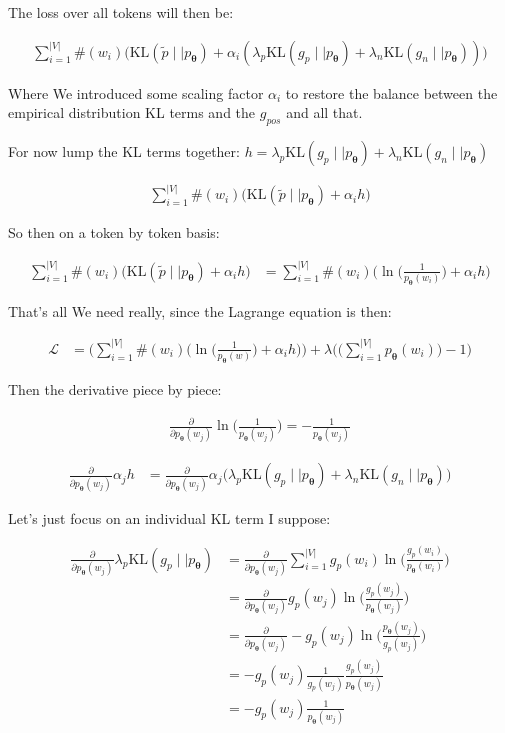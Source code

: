 \documentclass{article}
\newcommand{\KL}{\mathrm{KL}}
\newcommand{\vtheta}{\boldsymbol{\theta}}
\newcommand{\model}{p_{\vtheta}}
\begin{document}
	    The loss over all tokens will then be:
		
		\begin{align}
			\sum^{|V|}_{i=1} \#(w_i)\big(\KL(\tilde{p}\mid\mid\model) + \alpha_i(\lambda_p\KL(g_p\mid\mid\model) + \lambda_n\KL(g_n\mid\mid\model))\big)
		\end{align}
		
		Where We introduced some scaling factor $\alpha_i$ to restore the balance between the empirical distribution KL terms and the $g_{pos}$ and all that.
		
		
		For now lump the KL terms together: $h = \lambda_p\KL(g_p\mid\mid\model) + \lambda_n\KL(g_n\mid\mid\model)$
		
		\begin{align}
			\sum^{|V|}_{i=1} \#(w_i)\big(\KL(\tilde{p}\mid\mid\model) + \alpha_i h\big)
		\end{align}
		
		So then on a token by token basis:
		
		\begin{align}
			\sum^{|V|}_{i=1} \#(w_i) \big(\KL(\tilde{p}\mid\mid\model) + \alpha_i h \big)&= \sum^{|V|}_{i=1} \#(w_i) \bigg(\ln\bigg(\frac{1}{\model(w_i)}\bigg) + \alpha_i h \bigg)
		\end{align}
		
		That's all We need really, since the Lagrange equation is then:
		
		\begin{align}
			\mathcal{L} &= \bigg(\sum^{|V|}_{i=1} \#(w_i) \bigg(\ln\bigg(\frac{1}{\model(w)}\bigg) + \alpha_i h \bigg)\bigg) + \lambda\bigg(\bigg(\sum^{|V|}_{i=1} \model(w_i)\bigg) -1 \bigg) 
		\end{align}
		
		Then the derivative piece by piece:
		
		\begin{align}
			\frac{\partial}{\partial \model(w_j)} \ln\bigg(\frac{1}{\model(w_j)}\bigg) = -\frac{1}{\model(w_j)}
		\end{align}
		
		\begin{align}
			\frac{\partial}{\partial \model(w_j)} \alpha_j h &= \frac{\partial}{\partial \model(w_j)} \alpha_j\big(\lambda_p\KL(g_p\mid\mid\model) + \lambda_n\KL(g_n\mid\mid\model)\big)
		\end{align}
		
		Let's just focus on an individual KL term I suppose:
		
		\begin{align}
			\frac{\partial}{\partial \model(w_j)} \lambda_p\KL(g_p\mid\mid\model) &= \frac{\partial}{\partial \model(w_j)} \sum^{|V|}_{i=1} g_p(w_i)\ln\bigg(\frac{g_p(w_i)}{\model(w_i)}\bigg)\\
			&= \frac{\partial}{\partial \model(w_j)} g_p(w_j)\ln\bigg(\frac{g_p(w_j)}{\model(w_j)}\bigg)\\
			&= \frac{\partial}{\partial \model(w_j)} -g_p(w_j)\ln\bigg(\frac{\model(w_j)}{g_p(w_j)}\bigg)\\
			&=  -g_p(w_j)\frac{1}{g_p(w_j)}\frac{g_p(w_j)}{\model(w_j)}\\
			&=  -g_p(w_j)\frac{1}{\model(w_j)}
		\end{align}
		
\end{document}
